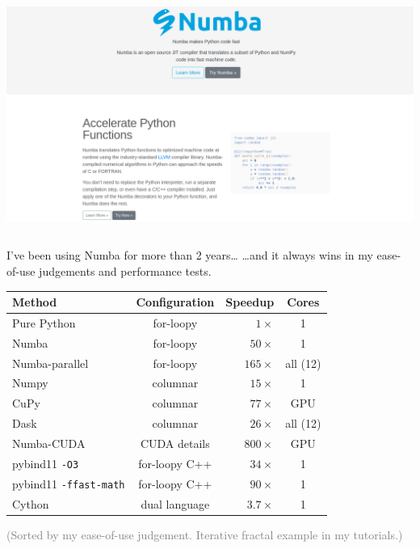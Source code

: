 \documentclass[aspectratio=169]{beamer}
\begin{document}
\begin{frame}{}
\begin{columns}
\includegraphics[width=\linewidth]{numba-website.png}
\end{columns}
\end{frame}

\begin{frame}{I've been using Numba for more than 2 years\ldots}
\vspace{0.5 cm}
{\large \ldots and it always wins in my ease-of-use judgements and performance tests.}

\begin{center}
\begin{tabular}{l c r c}
{\bf Method}               & {\bf Configuration} & {\bf Speedup} & {\bf Cores} \\\hline
Pure Python                & for-loopy           &     $1\times$ & 1 \\
Numba                      & for-loopy           &    $50\times$ & 1 \\
Numba-parallel             & for-loopy           &   $165\times$ & all (12) \\
Numpy                      & columnar            &    $15\times$ & 1 \\
CuPy                       & columnar            &    $77\times$ & GPU \\
Dask                       & columnar            &    $26\times$ & all (12) \\
Numba-CUDA                 & CUDA details        &   $800\times$ & GPU \\
pybind11 {\tt -O3}         & for-loopy C++       &    $34\times$ & 1 \\
pybind11 {\tt -ffast-math} & for-loopy C++       &    $90\times$ & 1 \\
Cython                     & dual language       &   $3.7\times$ & 1 \\
\end{tabular}
\end{center}

\textcolor{gray}{(Sorted by my ease-of-use judgement. Iterative fractal example in my tutorials.)}
\end{frame}
\end{document}

